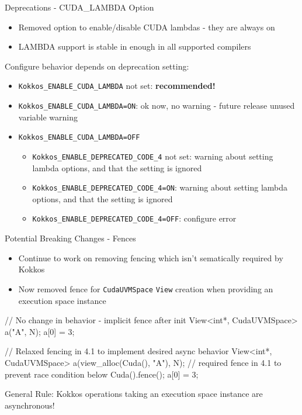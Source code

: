 \begin{frame}[fragile]{Deprecations - CUDA\_LAMBDA Option}
\begin{itemize}
  \item Removed option to enable/disable CUDA lambdas - they are always on
  \item LAMBDA support is stable in enough in all supported compilers
\end{itemize}

Configure behavior depends on deprecation setting:
{\small
\begin{itemize}
   \item \texttt{Kokkos\_ENABLE\_CUDA\_LAMBDA} not set: \textbf{recommended!}
   \item \texttt{Kokkos\_ENABLE\_CUDA\_LAMBDA=ON}: ok now, no warning - future release unused variable warning
   \item {
     \texttt{Kokkos\_ENABLE\_CUDA\_LAMBDA=OFF}
     \begin{itemize}
        \item \texttt{Kokkos\_ENABLE\_DEPRECATED\_CODE\_4} not set: warning about setting lambda options, and that the setting is ignored
        \item \texttt{Kokkos\_ENABLE\_DEPRECATED\_CODE\_4=ON}: warning about setting lambda options, and that the setting is ignored
        \item \texttt{Kokkos\_ENABLE\_DEPRECATED\_CODE\_4=OFF}: configure error
     \end{itemize}
   }
\end{itemize}
}
\end{frame}


\begin{frame}[fragile]{Potential Breaking Changes - Fences}
\begin{itemize}
   \item Continue to work on removing fencing which isn't sematically required by Kokkos
   \item Now removed fence for \texttt{CudaUVMSpace} \texttt{View} creation when providing an execution space instance
\end{itemize}

\begin{code}[keywords={View CudaUVMSpace fence Cuda}]
   // No change in behavior - implicit fence after init
   View<int*, CudaUVMSpace> a("A", N);
   a[0] = 3;

   // Relaxed fencing in 4.1 to implement desired async behavior
   View<int*, CudaUVMSpace> a(view_alloc(Cuda(), "A"), N);
   // required fence in 4.1 to prevent race condition below
   Cuda().fence();
   a[0] = 3;
\end{code}

\begin{alertblock}{General Rule:}
Kokkos operations taking an execution space instance are asynchronous!
\end{alertblock}
\end{frame}

